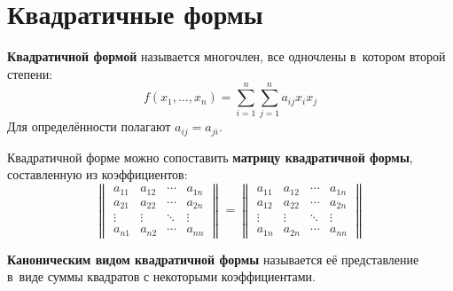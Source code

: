 \section{Квадратичные формы}
 \textbf{Квадратичной формой} называется многочлен, все одночлены в~котором второй степени:
\begin{equation*}
f(x_1, \ldots, x_n) = \sum_{i=1}^n \sum_{j=1}^n a_{ij} x_i x_j
\end{equation*}
Для определённости полагают $a_{ij} = a_{ji}$.

Квадратичной форме можно сопоставить \textbf{матрицу квадратичной формы}, составленную из коэффициентов:
\begin{equation*}
\begin{Vmatrix}
a_{11} & a_{12} & \cdots & a_{1n} \\
a_{21} & a_{22} & \cdots & a_{2n} \\
\vdots & \vdots & \ddots & \vdots \\
a_{n1} & a_{n2} & \cdots & a_{nn}
\end{Vmatrix} =
\begin{Vmatrix}
a_{11} & a_{12} & \cdots & a_{1n} \\
a_{12} & a_{22} & \cdots & a_{2n} \\
\vdots & \vdots & \ddots & \vdots \\
a_{1n} & a_{2n} & \cdots & a_{nn}
\end{Vmatrix}
\end{equation*}

\textbf{Каноническим видом квадратичной формы} называется её представление в~виде суммы квадратов с некоторыми коэффициентами.


